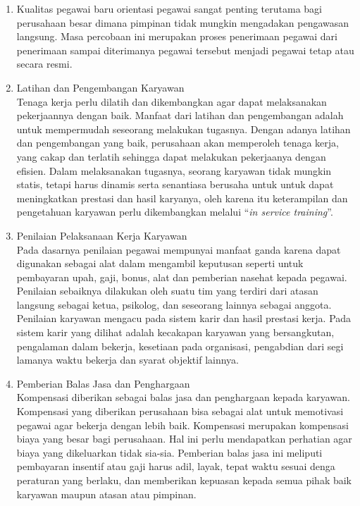 \begin{enumerate}
\item Kualitas pegawai baru orientasi pegawai sangat penting terutama bagi perusahaan besar dimana pimpinan tidak mungkin mengadakan pengawasan langsung. Masa percobaan ini merupakan proses penerimaan pegawai dari penerimaan sampai diterimanya pegawai tersebut menjadi pegawai tetap atau secara resmi.

\item Latihan dan Pengembangan Karyawan \\
Tenaga kerja perlu dilatih dan dikembangkan agar dapat melaksanakan pekerjaannya dengan baik. Manfaat dari latihan dan pengembangan adalah untuk mempermudah seseorang melakukan tugasnya. Dengan adanya latihan dan pengembangan yang baik, perusahaan akan memperoleh tenaga kerja, yang cakap dan terlatih sehingga dapat melakukan pekerjaanya dengan efisien. Dalam melaksanakan tugasnya, seorang karyawan tidak mungkin statis, tetapi harus dinamis serta senantiasa berusaha untuk untuk dapat meningkatkan prestasi dan hasil karyanya, oleh karena itu keterampilan dan pengetahuan karyawan perlu dikembangkan melalui “\textit{in service training}”.

\item Penilaian Pelaksanaan Kerja Karyawan \\
Pada dasarnya penilaian pegawai mempunyai manfaat ganda karena dapat digunakan sebagai alat dalam mengambil keputusan seperti untuk pembayaran upah, gaji, bonus, alat dan pemberian nasehat kepada pegawai. Penilaian sebaiknya dilakukan oleh suatu tim yang terdiri dari atasan langsung sebagai ketua, psikolog, dan seseorang lainnya sebagai anggota. Penilaian karyawan mengacu pada sistem karir dan hasil prestasi kerja. Pada sistem karir yang dilihat adalah kecakapan karyawan yang bersangkutan, pengalaman dalam bekerja, kesetiaan pada organisasi, pengabdian dari segi lamanya waktu bekerja dan syarat objektif lainnya. 

\item Pemberian Balas Jasa dan Penghargaan \\
Kompensasi diberikan sebagai balas jasa dan penghargaan kepada karyawan. Kompensasi yang diberikan perusahaan bisa sebagai alat untuk memotivasi pegawai agar bekerja dengan lebih baik. Kompensasi merupakan kompensasi biaya yang besar bagi perusahaan. Hal ini perlu mendapatkan perhatian agar biaya yang dikeluarkan tidak sia-sia. Pemberian balas jasa ini meliputi pembayaran insentif atau gaji harus adil, layak, tepat waktu sesuai denga peraturan yang berlaku, dan memberikan kepuasan kepada semua pihak baik karyawan maupun atasan atau pimpinan.

\end{enumerate}

